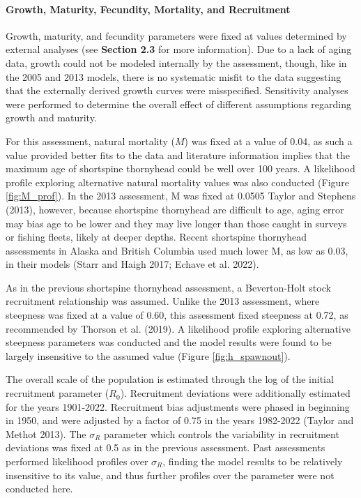 \documentclass[11pt,
  english,
  letterpaper,
]{article}
\begin{document}
\hypertarget{growth-maturity-fecundity-mortality-and-recruitment}{%
\paragraph{Growth, Maturity, Fecundity, Mortality, and Recruitment}\label{growth-maturity-fecundity-mortality-and-recruitment}}

Growth, maturity, and fecundity parameters were fixed at values determined by external analyses (see \textbf{Section 2.3} for more information). Due to a lack of aging data, growth could not be modeled internally by the assessment, though, like in the 2005 and 2013 models, there is no systematic misfit to the data suggesting that the externally derived growth curves were misspecified. Sensitivity analyses were performed to determine the overall effect of different assumptions regarding growth and maturity.

For this assessment, natural mortality (\(M\)) was fixed at a value of 0.04, as such a value provided better fits to the data and literature information implies that the maximum age of shortspine thornyhead could be well over 100 years. A likelihood profile exploring alternative natural mortality values was also conducted (Figure \ref{fig:M_prof}). In the 2013 assessment, M was fixed at 0.0505 Taylor and Stephens (2013), however, because shortspine thornyhead are difficult to age, aging error may bias age to be lower and they may live longer than those caught in surveys or fishing fleets, likely at deeper depths. Recent shortspine thornyhead assessments in Alaska and British Columbia used much lower M, as low as 0.03, in their models (Starr and Haigh 2017; Echave et al. 2022).

As in the previous shortspine thornyhead assessment, a Beverton-Holt stock recruitment relationship was assumed. Unlike the 2013 assessment, where steepness was fixed at a value of 0.60, this assessment fixed steepness at 0.72, as recommended by Thorson et al. (2019). A likelihood profile exploring alternative steepness parameters was conducted and the model results were found to be largely insensitive to the assumed value (Figure \ref{fig:h_spawnout}).

The overall scale of the population is estimated through the log of the initial recruitment parameter (\(R_0\)). Recruitment deviations were additionally estimated for the years 1901-2022. Recruitment bias adjustments were phased in beginning in 1950, and were adjusted by a factor of 0.75 in the years 1982-2022 (Taylor and Methot 2013). The \(\sigma_R\) parameter which controls the variability in recruitment deviations was fixed at 0.5 as in the previous assessment. Past assessments performed likelihood profiles over \(\sigma_R\), finding the model results to be relatively insensitive to its value, and thus further profiles over the parameter were not conducted here.
\end{document}
